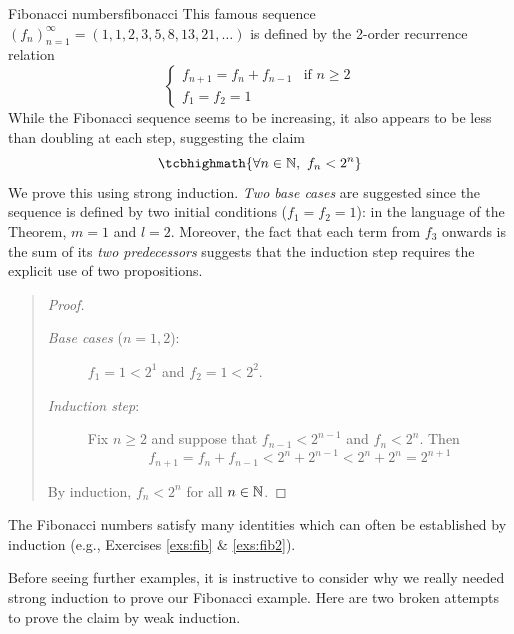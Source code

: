 \begin{example}{Fibonacci numbers}{fibonacci}
	This famous sequence $(f_n)_{n=1}^\infty=(1,1,2,3,5,8,13,21,\ldots)$ is defined by the 2\nd-order recurrence relation
	\[
		\begin{cases}
			f_{n+1}=f_n+f_{n-1}&\text{if }n\ge 2\\
			f_1=f_2=1&
		\end{cases}
	\]
	While the Fibonacci sequence seems to be increasing, it also appears to be less than doubling at each step, suggesting the claim
	\[
		\tcbhighmath{\forall n\in\N,\ f_n<2^n}
	\]
	We prove this using strong induction. \emph{Two base cases} are suggested since the sequence is defined by two initial conditions ($f_1=f_2=1$): in the language of the Theorem, $m=1$ and $l=2$. Moreover, the fact that each term from $f_3$ onwards is the sum of its \emph{two predecessors} suggests that the induction step requires the explicit use of two propositions.
	\begin{quote}
		\begin{proof}
			\begin{description}
				\item[\normalfont\emph{Base cases} ($n=1,2$):] $f_1=1<2^1$ and $f_2=1<2^2$.
				\item[\normalfont\emph{Induction step}:] Fix $n\ge 2$ and suppose\footnotemark{} that $f_{n-1}<2^{n-1}$ and $f_n<2^n$. Then
				\[
					f_{n+1}=f_n+f_{n-1}<2^n+2^{n-1}<2^n+2^n=2^{n+1}
				\]
			\end{description} 
			By induction, $f_n<2^n$ for all $n\in\mathbb{N}$.
		\end{proof}
	\end{quote}
	The Fibonacci numbers satisfy many identities which can often be established by induction (e.g., Exercises \ref{exs:fib} \& \ref{exs:fib2}).
\end{example}

\vspace{-5pt}


\goodbreak

Before seeing further examples, it is instructive to consider why we really needed strong induction to prove our Fibonacci example. Here are two broken attempts to prove the claim by weak induction.

